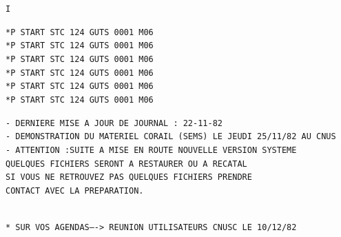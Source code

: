 

\texttt{\unsure{//*}\quad {}\quad I}


\texttt{*P START STC 124 GUTS 0001 M06}\\
\texttt{*P START STC 124 GUTS 0001 M06}\\
\texttt{*P START STC 124 GUTS 0001 M06}\\
\texttt{*P START STC 124 GUTS 0001 M06}\\
\texttt{*P START STC 124 GUTS 0001 M06}\\
\texttt{*P START STC 124 GUTS 0001 M06}

\texttt{- DERNIERE MISE A JOUR DE JOURNAL : 22-11-82}\\
\texttt{- DEMONSTRATION DU MATERIEL CORAIL (SEMS) LE JEUDI 25/11/82 AU CNUS}\\
\texttt{- ATTENTION :\quad SUITE A MISE EN ROUTE NOUVELLE VERSION SYSTEME}\\
\texttt{QUELQUES FICHIERS SERONT A RESTAURER OU A RECATAL}\\
\texttt{SI VOUS NE RETROUVEZ PAS QUELQUES FICHIERS PRENDRE}\\
\texttt{CONTACT AVEC LA PREPARATION.}

\texttt{\unsure{*****************************************************************}}\\
\texttt{* SUR VOS AGENDAS----> REUNION UTILISATEURS CNUSC LE 10/12/82}\\
\texttt{\unsure{*****************************************************************}}

